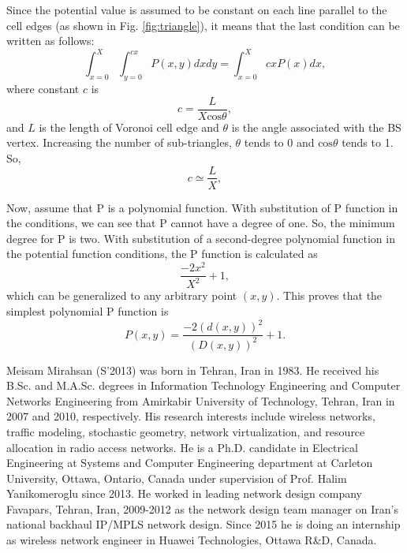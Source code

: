 \documentclass[journal]{IEEEtran}
\begin{document}
Since the potential value is assumed to be constant on each line parallel to the cell edges (as shown in Fig. \ref{fig:triangle}), it means that the last condition can be written as follows:
\begin{equation}
\int_{x=0}^{X}\int_{y=0}^{cx}P(x,y)dxdy = \int_{x=0}^{X}cxP(x)dx,
\end{equation}
where constant $c$ is
\begin{equation}
c = \frac{L}{X\text{cos}\theta},
\end{equation}
and $L$ is the length of Voronoi cell edge and $\theta$ is the angle associated with the BS vertex. Increasing the number of sub-triangles, $\theta$ tends to 0 and $\text{cos}\theta$ tends to 1. So,
\begin{equation}
c \simeq \frac{L}{X},
\end{equation}

Now, assume that P is a polynomial function. With substitution of P function in the conditions, we can see that P cannot have a degree of one. So, the minimum degree for P is two. With substitution of a second-degree polynomial function in the potential function conditions, the P function is calculated as
\begin{equation}
\frac{-2x^{2}}{X^2}+1,
\end{equation}
which can be generalized to any arbitrary point $(x,y)$. This proves that the simplest polynomial P function is
\begin{equation}
P(x,y) = \frac{-2(d(x,y))^{2}}{(D(x,y))^{2}}+1.
\end{equation}




\begin{IEEEbiography}{Meisam Mirahsan}
(S'2013) was born in Tehran, Iran in 1983. He received his B.Sc. and M.A.Sc. degrees in Information Technology Engineering and Computer Networks Engineering from Amirkabir University of Technology, Tehran, Iran in 2007 and 2010, respectively.
His research interests include wireless networks, traffic modeling, stochastic geometry, network virtualization, and resource allocation in radio access networks.
He is a Ph.D. candidate in Electrical Engineering at Systems and Computer Engineering department at Carleton University, Ottawa, Ontario, Canada under supervision of Prof. Halim Yanikomeroglu since 2013.
He worked in leading network design company Favapars, Tehran, Iran, 2009-2012 as the network design team manager on Iran's national backhaul IP/MPLS network design.
Since 2015 he is doing an internship as wireless network engineer in Huawei Technologies, Ottawa R\&D, Canada.
\end{IEEEbiography}
\end{document}
